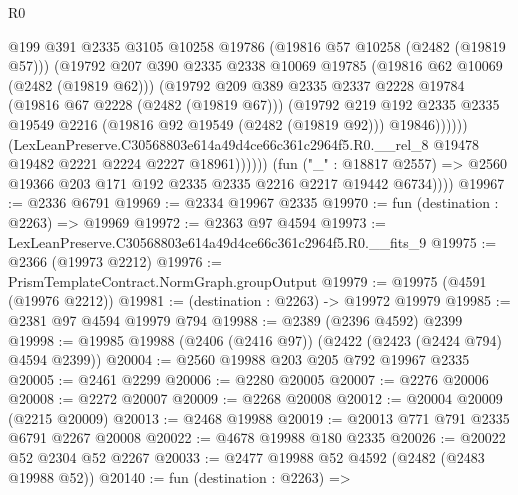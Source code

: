 \begin{lexlean}{R0}
\begin{coremodule}
                          @199
                          @391
                          @2335
                          @3105
                          @10258
                          @19786
                          (@19816 @57 @10258 (@2482 (@19819 @57)))
                          (@19792
                            @207
                            @390
                            @2335
                            @2338
                            @10069
                            @19785
                            (@19816 @62 @10069 (@2482 (@19819 @62)))
                            (@19792
                              @209
                              @389
                              @2335
                              @2337
                              @2228
                              @19784
                              (@19816 @67 @2228 (@2482 (@19819 @67)))
                              (@19792
                                @219
                                @192
                                @2335
                                @2335
                                @19549
                                @2216
                                (@19816 @92 @19549 (@2482 (@19819 @92)))
                                @19846))))))
                    (LexLeanPreserve.C30568803e614a49d4ce66c361c2964f5.R0.__rel_8
                      @19478
                      @19482
                      @2221
                      @2224
                      @2227
                      @18961))))))
          (fun ("_" : @18817 @2557) =>
          @2560 @19366 @203 @171 @192 @2335 @2335 @2216 @2217 @19442 @6734))))
@19967 := @2336 @6791
@19969 := @2334 @19967 @2335
@19970 := fun (destination : @2263) => @19969
@19972 := @2363 @97 @4594
@19973 := LexLeanPreserve.C30568803e614a49d4ce66c361c2964f5.R0.__fits_9
@19975 := @2366 (@19973 @2212)
@19976 := PrismTemplateContract.NormGraph.groupOutput
@19979 := @19975 (@4591 (@19976 @2212))
@19981 := (destination : @2263) -> @19972 @19979
@19985 := @2381 @97 @4594 @19979 @794
@19988 := @2389 (@2396 @4592) @2399
@19998 := @19985 @19988 (@2406 (@2416 @97)) (@2422 (@2423 (@2424 @794) @4594 @2399))
@20004 := @2560 @19988 @203 @205 @792 @19967 @2335
@20005 := @2461 @2299
@20006 := @2280 @20005
@20007 := @2276 @20006
@20008 := @2272 @20007
@20009 := @2268 @20008
@20012 := @20004 @20009 (@2215 @20009)
@20013 := @2468 @19988
@20019 := @20013 @771 @791 @2335 @6791 @2267 @20008
@20022 := @4678 @19988 @180 @2335
@20026 := @20022 @52 @2304 @52 @2267
@20033 := @2477 @19988 @52 @4592 (@2482 (@2483 @19988 @52))
@20140 := fun (destination : @2263) =>

\end{coremodule}
\end{lexlean}
